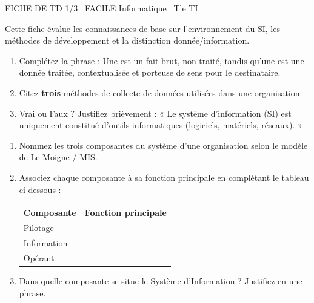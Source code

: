 \documentclass[11pt]{article}
\begin{document}
\begin{tcolorbox}[enhanced,colback=popink,colframe=popink,arc=10pt,boxrule=0pt,left=12pt,right=12pt,top=9pt,bottom=9pt]
{\color{white}\popxbold\small FICHE DE TD 1/3 \textbullet\ FACILE \hfill Informatique \textbullet\ Tle TI\par}
\end{tcolorbox}
\vspace{4pt}
Cette fiche évalue les connaissances de base sur l'environnement du SI, les méthodes de développement et la distinction donnée/information.

\begin{exercice}
\begin{enumerate}
    \item Complétez la phrase : Une \underline{\hspace{4cm}} est un fait brut, non traité, tandis qu'une \underline{\hspace{4cm}} est une donnée traitée, contextualisée et porteuse de sens pour le destinataire.
    \item Citez \textbf{trois} méthodes de collecte de données utilisées dans une organisation.
    \item Vrai ou Faux ? Justifiez brièvement : « Le système d'information (SI) est uniquement constitué d'outils informatiques (logiciels, matériels, réseaux). »
\end{enumerate}
\end{exercice}

\begin{exercice}
\begin{enumerate}
    \item Nommez les trois composantes du système d'une organisation selon le modèle de Le Moigne / MIS.
    \item Associez chaque composante à sa fonction principale en complétant le tableau ci-dessous :
    \begin{tabular}{|l|p{8cm}|}
    \hline
    \textbf{Composante} & \textbf{Fonction principale} \\ \hline
    Pilotage & \\ \hline
    Information & \\ \hline
    Opérant & \\ \hline
    \end{tabular}
    \item Dans quelle composante se situe le Système d'Information ? Justifiez en une phrase.
\end{enumerate}
\end{exercice}
\end{document}

